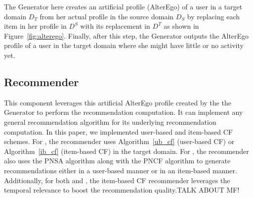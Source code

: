  The Generator here creates an artificial profile (AlterEgo) of a user in a target domain $D_T$ from her actual profile in the source domain $D_S$ by replacing each item in her profile in $D^S$ with its replacement in $D^T$ as shown in Figure~\ref{fig:alterego}.  Finally, after this step, the Generator outputs the AlterEgo profile of a user in the target domain where she might have little or no activity yet.

\subsection{Recommender}
This component leverages this artificial AlterEgo profile created by the the Generator to perform the recommendation computation. It can implement any general recommendation algorithm for its underlying recommendation computation. In this paper, we implemented user-based and item-based CF schemes. For \npcrossrec, the recommender uses Algorithm~\ref{ub_cf} (user-based CF) or Algorithm~\ref{ib_cf} (item-based CF) in the target domain. For \crossrec, the recommender also uses the PNSA algorithm along with the PNCF algorithm to generate recommendations either in a user-based manner or in an item-based manner. Additionally, for both \npcrossrec and \crossrec, the item-based CF recommender leverages the temporal relevance to boost the recommendation quality.{\color{red}TALK ABOUT MF!}

